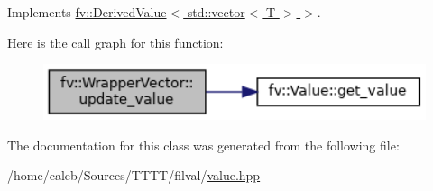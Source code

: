 Implements \hyperlink{classfv_1_1DerivedValue_ae59e80a98eb74b95d8961bfe12ee5ec2}{fv\+::\+Derived\+Value$<$ std\+::vector$<$ T $>$ $>$}.

Here is the call graph for this function\+:
\nopagebreak
\begin{figure}[H]
\begin{center}
\leavevmode
\includegraphics[width=338pt]{classfv_1_1WrapperVector_a2ee99bc4425642d209df7b48ee2ada95_cgraph}
\end{center}
\end{figure}


The documentation for this class was generated from the following file\+:\begin{DoxyCompactItemize}
\item 
/home/caleb/\+Sources/\+T\+T\+T\+T/filval/\hyperlink{value_8hpp}{value.\+hpp}\end{DoxyCompactItemize}
